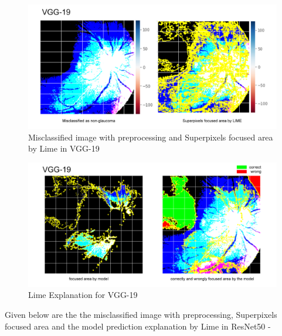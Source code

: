 \vspace{5mm}
\begin{figure}[hbt!]
\centering
\includegraphics[scale=0.5]{images/fig-48.png}
\caption{Misclassified image with preprocessing and Superpixels focused area by Lime in VGG-19}
\label{fig:x Misclassified image with preprocessing and Superpixels focused area by Lime in VGG-19}
\end{figure}

\vspace{5mm}
\begin{figure}[hbt!]
\centering
\includegraphics[scale=0.5]{images/fig-49.png}
\caption{Lime Explanation for VGG-19}
\label{fig:x Lime Explanation for VGG-19}
\end{figure}

\newpage
\vspace{5mm}
Given below are the the misclassified image with preprocessing, Superpixels focused area and the model prediction explanation by Lime in ResNet50 -

